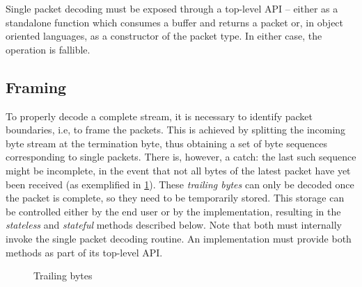 \documentclass[a4paper,11pt,english]{article}
\begin{document}
Single packet decoding must be exposed through a top-level API -- either as a standalone function which consumes a buffer and returns a packet or, in object oriented languages, as a constructor of the packet type. In either case, the operation is fallible.

\subsection[dec:framing]{Framing}
To properly decode a complete stream, it is necessary to identify packet boundaries, i.e, to frame the packets. This is achieved by splitting the incoming byte stream at the termination byte, thus obtaining a set of byte sequences corresponding to single packets. There is, however, a catch: the last such sequence might be incomplete, in the event that not all bytes of the latest packet have yet been received (as exemplified in \cref{fig:trailing-bytes}). These \textit{trailing bytes} can only be decoded once the packet is complete, so they need to be temporarily stored. This storage can be controlled either by the end user or by the implementation, resulting in the \textit{stateless} and \textit{stateful} methods described below. Note that both must internally invoke the single packet decoding routine. An implementation must provide both methods as part of its top-level API.

\begin{figure}[h]
  \centering
  \caption{Trailing bytes}\label{fig:trailing-bytes}
\end{figure}
\end{document}
